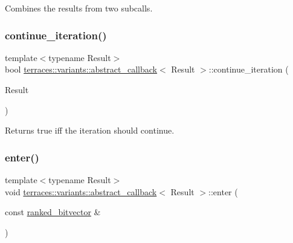 Combines the results from two subcalls. \mbox{\label{classterraces_1_1variants_1_1abstract__callback_ac90e8de571a8ad0d135f1b6fd14c3103}} 
\subsubsection{\texorpdfstring{continue\+\_\+iteration()}{continue\_iteration()}}
{\footnotesize\ttfamily template$<$typename Result$>$ \\
bool \hyperlink{classterraces_1_1variants_1_1abstract__callback}{terraces\+::variants\+::abstract\+\_\+callback}$<$ Result $>$\+::continue\+\_\+iteration (\begin{DoxyParamCaption}\item[{Result}]{ }\end{DoxyParamCaption})\hspace{0.3cm}{\ttfamily [inline]}}

Returns true iff the iteration should continue. \mbox{\label{classterraces_1_1variants_1_1abstract__callback_adf435bcc662fcf318ce9346a96a6a38f}} 
\subsubsection{\texorpdfstring{enter()}{enter()}}
{\footnotesize\ttfamily template$<$typename Result$>$ \\
void \hyperlink{classterraces_1_1variants_1_1abstract__callback}{terraces\+::variants\+::abstract\+\_\+callback}$<$ Result $>$\+::enter (\begin{DoxyParamCaption}\item[{const \hyperlink{namespaceterraces_acc45ec9c561024c50ecbce5b6738ba08}{ranked\+\_\+bitvector} \&}]{ }\end{DoxyParamCaption})\hspace{0.3cm}{\ttfamily [inline]}}

